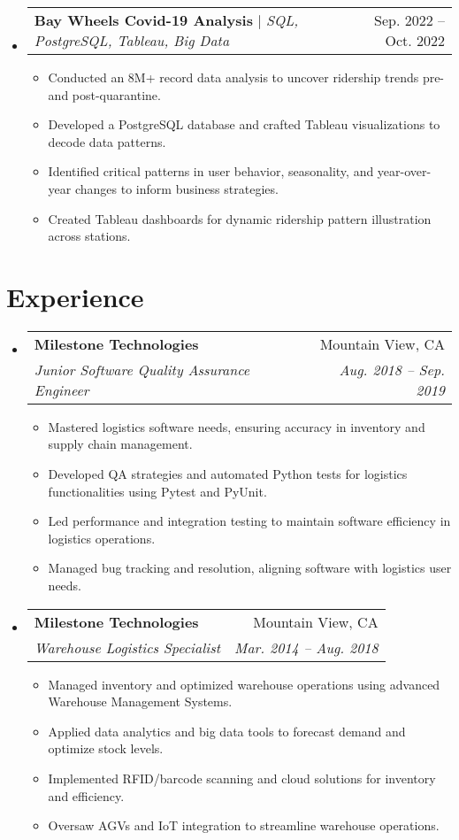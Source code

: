 \documentclass[letterpaper,11pt]{article}
\makeatletter
\newcommand{\resumeItem}[1]{\item\small{{#1 \vspace{-2pt}}}}
\newcommand{\resumeSubheading}[4]{
    \vspace{-2pt}\item
    \begin{tabular*}{0.97\textwidth}[t]{l@{\extracolsep{\fill}}r}
        \textbf{#1} & #2 \\
        \textit{\small#3} & \textit{\small #4} \\
    \end{tabular*}\vspace{-7pt}
}
\newcommand{\resumeProjectHeading}[2]{\item\begin{tabular*}{0.97\textwidth}{l@{\extracolsep{\fill}}r}\small#1 & #2 \end{tabular*}\vspace{-7pt}}
\newcommand{\smallbullet}{\raisebox{0.3ex}{\scalebox{0.7}{$\bullet$}}} %
\newenvironment{resumeSubHeadingList}{\begin{itemize}[leftmargin=0.15in, label={}]}{\end{itemize}}
\newenvironment{resumeItemList}{\begin{itemize}[label=\smallbullet]}{\end{itemize}\vspace{-5pt}}
\makeatother
\begin{document}
\begin{resumeSubHeadingList}
        \resumeProjectHeading
        {\textbf{Bay Wheels Covid-19 Analysis} $|$ \emph{SQL, PostgreSQL, Tableau, Big Data}}{Sep. 2022 -- Oct. 2022}
        \begin{resumeItemList}
            \resumeItem{Conducted an 8M+ record data analysis to uncover ridership trends pre- and post-quarantine.}
            \resumeItem{Developed a PostgreSQL database and crafted Tableau visualizations to decode data patterns.}
            \resumeItem{Identified critical patterns in user behavior, seasonality, and year-over-year changes to inform business strategies.}
            \resumeItem{Created Tableau dashboards for dynamic ridership pattern illustration across stations.}
        \end{resumeItemList}
    \end{resumeSubHeadingList}

    \section{Experience}
    \label{sec:experience}
    \begin{resumeSubHeadingList}
        \resumeSubheading
        {Milestone Technologies}{Mountain View, CA}
        {Junior Software Quality Assurance Engineer}{Aug. 2018 -- Sep. 2019}
        \begin{resumeItemList}
            \resumeItem{Mastered logistics software needs, ensuring accuracy in inventory and supply chain management.}
            \resumeItem{Developed QA strategies and automated Python tests for logistics functionalities using Pytest and PyUnit.}
            \resumeItem{Led performance and integration testing to maintain software efficiency in logistics operations.}
            \resumeItem{Managed bug tracking and resolution, aligning software with logistics user needs.}
        \end{resumeItemList}

        \resumeSubheading
        {Milestone Technologies}{Mountain View, CA}
        {Warehouse Logistics Specialist}{Mar. 2014 -- Aug. 2018}
        \begin{resumeItemList}
            \resumeItem{Managed inventory and optimized warehouse operations using advanced Warehouse Management Systems.}
            \resumeItem{Applied data analytics and big data tools to forecast demand and optimize stock levels.}
            \resumeItem{Implemented RFID/barcode scanning and cloud solutions for inventory and efficiency.}
            \resumeItem{Oversaw AGVs and IoT integration to streamline warehouse operations.}
        \end{resumeItemList}
    \end{resumeSubHeadingList}
\end{document}
